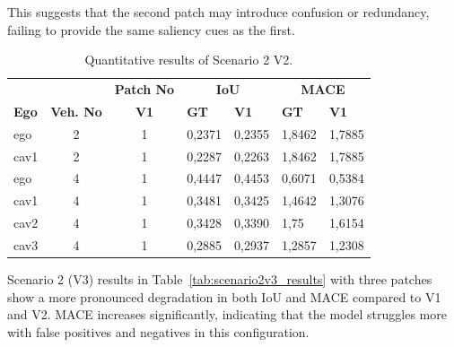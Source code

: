 This suggests that the second patch may introduce confusion or redundancy, failing to provide the same saliency cues as the first.
\begin{table}[tph]
    \centering
    \caption{Quantitative results of Scenario 2 V2.}
    \label{tab:scenario2v2_results}
    \begin{tabularx}{\textwidth}{l c c *{4}{X}}
        \toprule
                         &             & \multicolumn{1}{c}{\textbf{Patch No}} & \multicolumn{2}{c}{\textbf{IoU}} & \multicolumn{2}{c}{\textbf{MACE}}                   \\
        \cmidrule(lr){4-5}\cmidrule(lr){6-7}
        \textbf{Ego}     &
        \textbf{Veh. No} &
        \textbf{V1}      &
        \textbf{GT}      & \textbf{V1} &
        \textbf{GT}      & \textbf{V1}                                                                                                                                  \\
        \midrule %
        ego              & 2           & 1                                     & 0,2371                           & 0,2355                            & 1,8462 & 1,7885 \\
        cav1             & 2           & 1                                     & 0,2287                           & 0,2263                            & 1,8462 & 1,7885 \\
        \midrule
        ego              & 4           & 1                                     & 0,4447                           & 0,4453                            & 0,6071 & 0,5384 \\
        cav1             & 4           & 1                                     & 0,3481                           & 0,3425                            & 1,4642 & 1,3076 \\
        cav2             & 4           & 1                                     & 0,3428                           & 0,3390                            & 1,75   & 1,6154 \\
        cav3             & 4           & 1                                     & 0,2885                           & 0,2937                            & 1,2857 & 1,2308 \\
        \bottomrule
    \end{tabularx}
\end{table}
Scenario 2 (V3) results in Table~\ref{tab:scenario2v3_results} with three patches show a more pronounced degradation in both IoU and MACE compared to V1 and V2.
MACE increases significantly, indicating that the model struggles more with false positives and negatives in this configuration.
